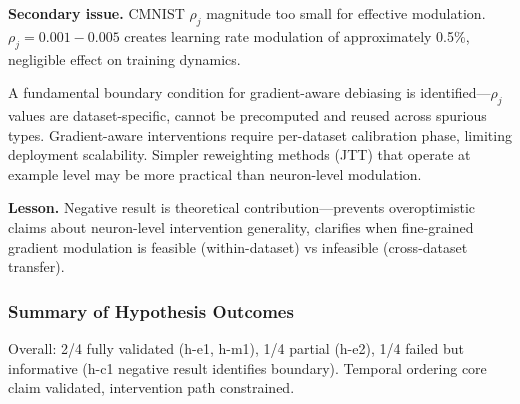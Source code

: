 \textbf{Secondary issue.} CMNIST $\rho_j$ magnitude too small for effective modulation. $\rho_j = 0.001-0.005$ creates learning rate modulation of approximately 0.5\%, negligible effect on training dynamics.

A fundamental boundary condition for gradient-aware debiasing is identified---$\rho_j$ values are dataset-specific, cannot be precomputed and reused across spurious types. Gradient-aware interventions require per-dataset calibration phase, limiting deployment scalability. Simpler reweighting methods (JTT) that operate at example level may be more practical than neuron-level modulation.

\textbf{Lesson.} Negative result is theoretical contribution---prevents overoptimistic claims about neuron-level intervention generality, clarifies when fine-grained gradient modulation is feasible (within-dataset) vs infeasible (cross-dataset transfer).

\subsubsection{Summary of Hypothesis Outcomes}

\begin{table}[htbp]
\centering
{}
\end{table}

Overall: 2/4 fully validated (h-e1, h-m1), 1/4 partial (h-e2), 1/4 failed but informative (h-c1 negative result identifies boundary). Temporal ordering core claim validated, intervention path constrained.
